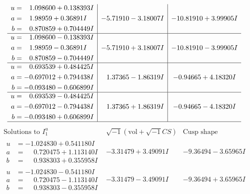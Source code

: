 \documentclass[1p]{elsarticle_modified}
\theoremstyle{definition}
\newcommand{\I}{\sqrt{-1}}
\begin{document}
$$\begin{array}{c|c|c}
\begin{aligned}
u &= \phantom{-}1.098600 + 0.138393 I \\
a &= \phantom{-}1.98959 + 0.36891 I \\
b &= \phantom{-}0.870859 + 0.704449 I\end{aligned}
 & -5.71910 - 3.18007 I & -10.81910 + 3.99905 I \\ \hline\begin{aligned}
u &= \phantom{-}1.098600 - 0.138393 I \\
a &= \phantom{-}1.98959 - 0.36891 I \\
b &= \phantom{-}0.870859 - 0.704449 I\end{aligned}
 & -5.71910 + 3.18007 I & -10.81910 - 3.99905 I \\ \hline\begin{aligned}
u &= \phantom{-}0.693539 + 0.484425 I \\
a &= -0.697012 + 0.794438 I \\
b &= -0.093480 - 0.606899 I\end{aligned}
 & \phantom{-}1.37365 - 1.86319 I & -0.94665 + 4.18320 I \\ \hline\begin{aligned}
u &= \phantom{-}0.693539 - 0.484425 I \\
a &= -0.697012 - 0.794438 I \\
b &= -0.093480 + 0.606899 I\end{aligned}
 & \phantom{-}1.37365 + 1.86319 I & -0.94665 - 4.18320 I\\
 \hline 
 \end{array}$$\newpage$$\begin{array}{c|c|c}  
\text{Solutions to }I^u_{1}& \I (\text{vol} + \sqrt{-1}CS) & \text{Cusp shape}\\
 \hline 
\begin{aligned}
u &= -1.024830 + 0.541180 I \\
a &= \phantom{-}0.720475 + 1.113140 I \\
b &= \phantom{-}0.938303 + 0.355958 I\end{aligned}
 & -3.31479 + 3.49091 I & -9.36494 - 3.65965 I \\ \hline\begin{aligned}
u &= -1.024830 - 0.541180 I \\
a &= \phantom{-}0.720475 - 1.113140 I \\
b &= \phantom{-}0.938303 - 0.355958 I\end{aligned}
 & -3.31479 - 3.49091 I & -9.36494 + 3.65965 I \\ \hline\begin{aligned}

\end{aligned}
\end{array}$$
\end{document}
